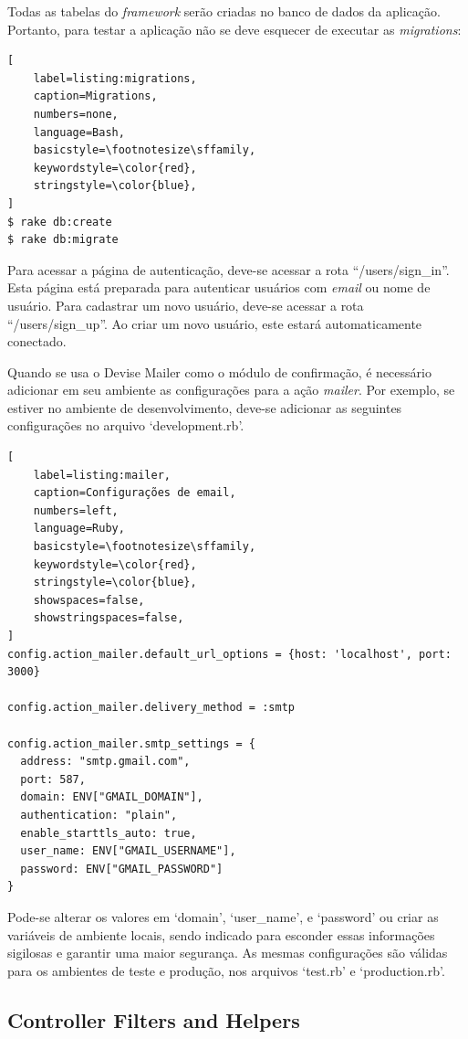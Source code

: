 Todas as tabelas do \textit{framework} serão criadas no banco de dados da aplicação. Portanto, para testar a aplicação não se deve esquecer de executar as \textit{migrations}:

\begin{lstlisting}[
    label=listing:migrations,
    caption=Migrations,
    numbers=none,
    language=Bash,
    basicstyle=\footnotesize\sffamily,
    keywordstyle=\color{red},
    stringstyle=\color{blue},
]
$ rake db:create
$ rake db:migrate
\end{lstlisting}

Para acessar a página de autenticação, deve-se acessar a rota ``/users/sign\_in''. Esta página está preparada para autenticar usuários com \textit{email} ou nome de usuário. Para cadastrar um novo usuário, deve-se acessar a rota ``/users/sign\_up''. Ao criar um novo usuário, este estará automaticamente conectado.

Quando se usa o Devise Mailer como o módulo de confirmação, é necessário adicionar em seu ambiente as configurações para a ação \textit{mailer}. Por exemplo, se estiver no ambiente de desenvolvimento, deve-se adicionar as seguintes configurações no arquivo `development.rb'.

\begin{lstlisting}[
    label=listing:mailer,
    caption=Configurações de email,
    numbers=left,
    language=Ruby,
    basicstyle=\footnotesize\sffamily,
    keywordstyle=\color{red},
    stringstyle=\color{blue},
    showspaces=false,
    showstringspaces=false,
]
config.action_mailer.default_url_options = {host: 'localhost', port: 3000}

config.action_mailer.delivery_method = :smtp

config.action_mailer.smtp_settings = {
  address: "smtp.gmail.com",
  port: 587,
  domain: ENV["GMAIL_DOMAIN"],
  authentication: "plain",
  enable_starttls_auto: true,
  user_name: ENV["GMAIL_USERNAME"],
  password: ENV["GMAIL_PASSWORD"]
}
\end{lstlisting}

Pode-se alterar os valores em `domain', `user\_name', e `password' ou criar as variáveis de ambiente locais, sendo indicado para esconder essas informações sigilosas e garantir uma maior segurança. As mesmas configurações são válidas para os ambientes de teste e produção, nos arquivos `test.rb' e `production.rb'.

\subsection{Controller Filters and Helpers}

